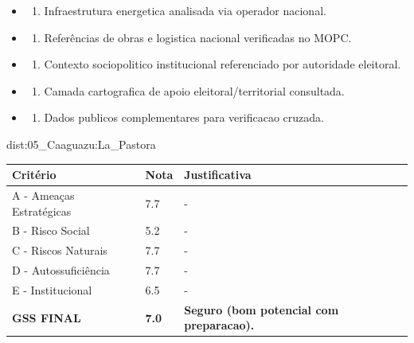 {\begin{itemize}
\item
  \begin{enumerate}
  \def\labelenumi{\arabic{enumi})}
  \setcounter{enumi}{7}
  \tightlist
  \item
    Infraestrutura energetica analisada via operador nacional.
  \end{enumerate}
\item
  \begin{enumerate}
  \def\labelenumi{\arabic{enumi})}
  \setcounter{enumi}{8}
  \tightlist
  \item
    Referências de obras e logistica nacional verificadas no MOPC.
  \end{enumerate}
\item
  \begin{enumerate}
  \def\labelenumi{\arabic{enumi})}
  \setcounter{enumi}{9}
  \tightlist
  \item
    Contexto sociopolitico institucional referenciado por autoridade
    eleitoral.
  \end{enumerate}
\item
  \begin{enumerate}
  \def\labelenumi{\arabic{enumi})}
  \setcounter{enumi}{10}
  \tightlist
  \item
    Camada cartografica de apoio eleitoral/\allowbreak territorial consultada.
  \end{enumerate}
\item
  \begin{enumerate}
  \def\labelenumi{\arabic{enumi})}
  \setcounter{enumi}{11}
  \tightlist
  \item
    Dados publicos complementares para verificacao cruzada.
  \end{enumerate}
\end{itemize}}{dist:05_Caaguazu:La_Pastora}
\begin{table}[ht!]
\small \begin{tabular}{p{3.0cm}p{0.8cm}p{6.0cm}} \toprule
\textbf{Critério} & \textbf{Nota} & \textbf{Justificativa} \\ \midrule
A - Ameaças Estratégicas & 7.7 & - \\
B - Risco Social & 5.2 & - \\
C - Riscos Naturais & 7.7 & - \\
D - Autossuficiência & 7.7 & - \\
E - Institucional & 6.5 & - \\
\midrule \textbf{GSS FINAL} & \textbf{7.0} & \textbf{Seguro (bom potencial com preparacao).} \\ \bottomrule \end{tabular}
\end{table}

